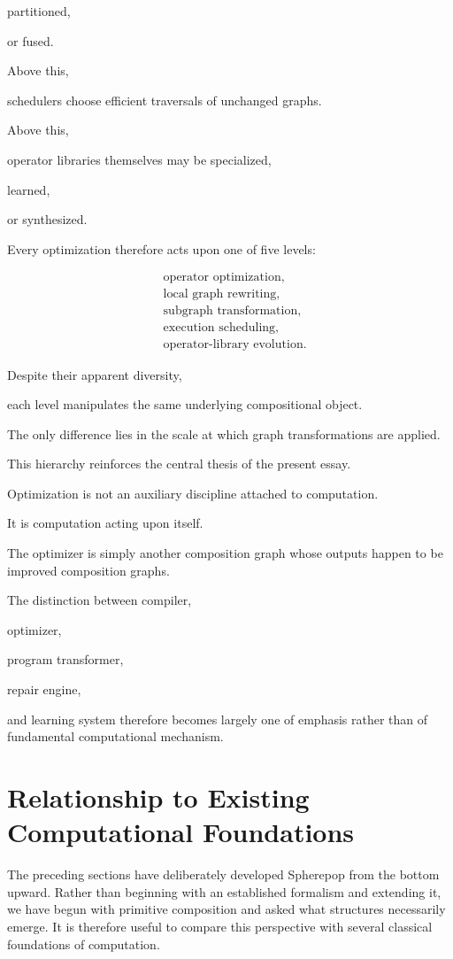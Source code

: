 \documentclass[12pt,oneside]{article}
\begin{document}
partitioned,

or fused.

Above this,

schedulers choose efficient traversals of unchanged graphs.

Above this,

operator libraries themselves may be specialized,

learned,

or synthesized.

Every optimization therefore acts upon one of five levels:

\[
\begin{aligned}
&\text{operator optimization},\\
&\text{local graph rewriting},\\
&\text{subgraph transformation},\\
&\text{execution scheduling},\\
&\text{operator-library evolution}.
\end{aligned}
\]

Despite their apparent diversity,

each level manipulates the same underlying compositional object.

The only difference lies in the scale at which graph transformations are applied.

This hierarchy reinforces the central thesis of the present essay.

Optimization is not an auxiliary discipline attached to computation.

It is computation acting upon itself.

The optimizer is simply another composition graph whose outputs happen to be improved composition graphs.

The distinction between compiler,

optimizer,

program transformer,

repair engine,

and learning system therefore becomes largely one of emphasis rather than of fundamental computational mechanism.

\section{Relationship to Existing Computational Foundations}

The preceding sections have deliberately developed Spherepop from the bottom upward. Rather than beginning with an established formalism and extending it, we have begun with primitive composition and asked what structures necessarily emerge. It is therefore useful to compare this perspective with several classical foundations of computation.
\end{document}
